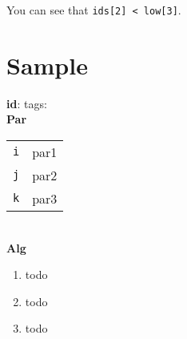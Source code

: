 \documentclass{article}
\begin{document}
You can see that \texttt{ids[2] < low[3]}.

\clearpage %
\section*{Sample}
\textbf{id}: \quad tags: \\
\textbf{Par}
\begin{tabular}{ll}
    \texttt{i}  & par1 \\
    \texttt{j}  & par2 \\
    \texttt{k}  & par3 \\
\end{tabular}
\\ \textbf{Alg}
\begin{enumerate}
\item
    todo
\item
    todo
\item
    todo

\end{enumerate}
\
\section*{}



\begin{comment}
\begin{equation*}
\begin{split}
    \mathcal{L}(H(S), \lambda) 
    &= \sum_{i=1}^9 p_i \log_3{\frac{1}{p_i}} + \lambda \left(\sum_{i=1}^9 p_i - 1 \right) \\
    \pdv{\mathcal{L}}{p_i}
    &= -\log_3{p_i} - \frac{1}{\ln{3}} + \lambda = 0 \quad i \in \{1,2,\dots,9\} \\
    \pdv{\mathcal{L}}{\lambda}
    &= \sum_{i=1}^9 p_i - 1 = 0 \\
    \therefore p_i &= \frac{1}{9}
\end{split}
\end{equation*}
\end{comment}
\end{document}
